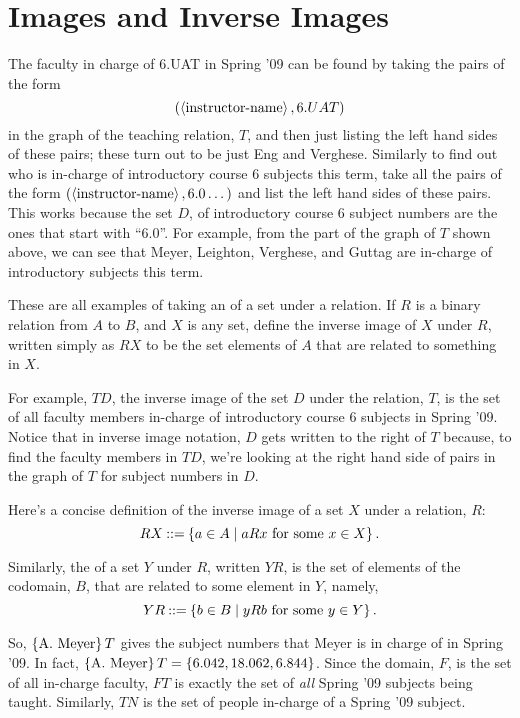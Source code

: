 \section{Images and Inverse Images}

The faculty in charge of 6.UAT in Spring '09 can be found by taking the
pairs of the form
\[
(\left\langle\text{instructor-name}\right\rangle, 6.UAT)
\]
in the graph of the teaching relation, $T$, and then just listing the left
hand sides of these pairs; these turn out to be just Eng and Verghese.
Similarly to find out who is in-charge of introductory course 6 subjects
this term, take all the pairs of the form $(\left\langle\text{instructor-name}\right\rangle,
6.0\dots)$ and list the left hand sides of these pairs.  This works because
the set $D$, of introductory course 6 subject numbers are the ones that
start with ``6.0''.  For example, from the part of the graph of $T$ shown
above, we can see that Meyer, Leighton, Verghese, and Guttag are in-charge
of introductory subjects this term.

These are all examples of taking an  of a set under a
relation.  If $R$ is a binary relation from $A$ to $B$, and $X$ is any
set, define the inverse image of $X$ under $R$, written simply as
$RX$ to be the set elements of $A$ that are related to something in $X$.

For example, $TD$, the inverse image of the set $D$ under the relation,
$T$, is the set of all faculty members in-charge of introductory course 6
subjects in Spring '09.  Notice that in inverse image notation, $D$ gets
written to the right of $T$ because, to find the faculty members in $TD$,
we're looking at the right hand side of pairs in the graph of $T$ for
subject numbers in $D$.

Here's a concise definition of the inverse image of a set $X$ under
a relation, $R$:
\[
RX \mathbin{::=} \left\{a \in A \mid aRx \text{ for some } x \in X\right\}.
\]

Similarly, the  of a set $Y$ under $R$, written $YR$, is the
set of elements of the codomain, $B$, that are related to some element in
$Y$, namely,
\[
YR \mathbin{::=} \left\{b \in B \mid yRb \text{ for some } y \in Y\right\}.
\]

So, $\left\{\text{A. Meyer}\right\}T$ gives the subject numbers that Meyer is in
charge of in Spring '09.  In fact, $\left\{\text{A. Meyer}\right\}T = \left\{6.042,
  18.062, 6.844\right\}$.  Since the domain, $F$, is the set of all in-charge
faculty, $FT$ is exactly the set of \emph{all} Spring '09 subjects being
taught.  Similarly, $TN$ is the set of people in-charge of a Spring '09
subject.


